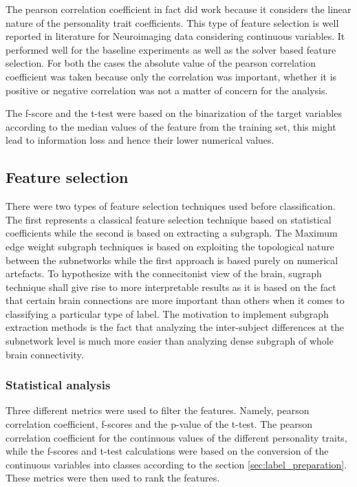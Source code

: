 \documentclass[msthesis.tex]{subfiles}
\begin{document}
The pearson correlation coefficient in fact did work because it considers the linear nature of the personality trait coefficients. This type of feature selection is well reported in literature for Neuroimaging data considering continuous variables. It performed well for the baseline experiments as well as the solver based feature selection. For both the cases the absolute value of the pearson correlation coefficient was taken because only the correlation was important, whether it is positive or negative correlation was not a matter of concern for the analysis.

The f-score and the t-test were based on the binarization of the target variables according to the median values of the feature from the training set, this might lead to information loss and hence their lower numerical values. 

\subsection{Feature selection} 
There were two types of feature selection techniques used before classification. The first represents a classical feature selection technique based on statistical coefficients while the second is based on extracting a subgraph. The Maximum edge weight subgraph techniques is based on exploiting the topological nature between the subnetworks while the first approach is based purely on numerical artefacts. To hypothesize with the connecitonist view of the brain, sugraph technique shall give rise to more interpretable results as it is based on the fact that certain brain connections are more important than others when it comes to classifying a particular type of label. The motivation to implement subgraph extraction methods is the fact that analyzing the inter-subject differences at the subnetwork level is much more easier than analyzing dense subgraph of whole brain connectivity. 

\subsubsection{Statistical analysis}
Three different metrics were used to filter the features. Namely, pearson correlation coefficient, f-scores and the p-value of the t-test. The pearson correlation coefficient for the continuous values of the different personality traits, while the f-scores and t-test calculations were based on the conversion of the continuous variables into classes according to the section \ref{sec:label_preparation}. These metrics were then used to rank the features.
\end{document}
